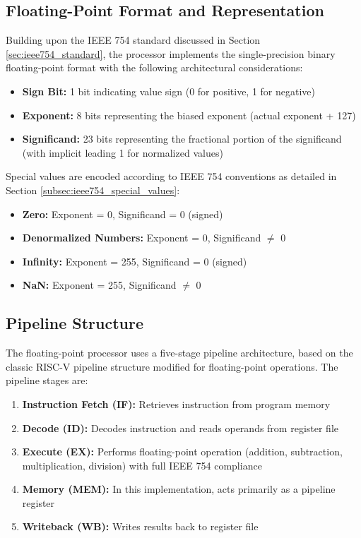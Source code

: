 \subsection{Floating-Point Format and Representation}
\label{subsec:fp_format}

Building upon the IEEE 754 standard discussed in Section \ref{sec:ieee754_standard}, the processor implements the single-precision binary floating-point format with the following architectural considerations:

\begin{itemize}
\item \textbf{Sign Bit:} 1 bit indicating value sign (0 for positive, 1 for negative)
\item \textbf{Exponent:} 8 bits representing the biased exponent (actual exponent + 127)
\item \textbf{Significand:} 23 bits representing the fractional portion of the significand (with implicit leading 1 for normalized values)
\end{itemize}

Special values are encoded according to IEEE 754 conventions as detailed in Section \ref{subsec:ieee754_special_values}:

\begin{itemize}
\item \textbf{Zero:} Exponent = 0, Significand = 0 (signed)
\item \textbf{Denormalized Numbers:} Exponent = 0, Significand $\neq$ 0
\item \textbf{Infinity:} Exponent = 255, Significand = 0 (signed)
\item \textbf{NaN:} Exponent = 255, Significand $\neq$ 0
\end{itemize}

\subsection{Pipeline Structure}
\label{subsec:pipeline_structure}

The floating-point processor uses a five-stage pipeline architecture, based on the classic RISC-V pipeline structure modified for floating-point operations. The pipeline stages are:

\begin{enumerate}
\item \textbf{Instruction Fetch (IF):} Retrieves instruction from program memory
\item \textbf{Decode (ID):} Decodes instruction and reads operands from register file
\item \textbf{Execute (EX):} Performs floating-point operation (addition, subtraction, multiplication, division) with full IEEE 754 compliance
\item \textbf{Memory (MEM):} In this implementation, acts primarily as a pipeline register
\item \textbf{Writeback (WB):} Writes results back to register file
\end{enumerate}

